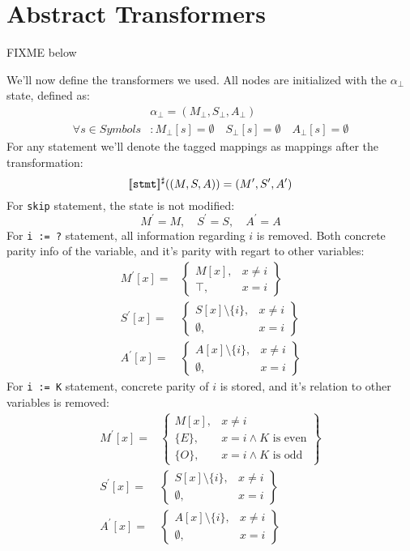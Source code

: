 \section*{Abstract Transformers}

FIXME below


We'll now define the transformers we used. All nodes are initialized with the $\alpha_\bot$ state, defined as:
\begin{align*}
	&\alpha_\bot=(M_\bot, S_\bot, A_\bot) \\
	\forall s \in Symbols&:
	M_\bot[s] =\emptyset  \quad
	S_\bot[s] =\emptyset \quad
	A_\bot[s] =\emptyset
\end{align*}
For any statement we'll denote the tagged mappings as mappings after the transformation:
\begin{equation*}
	[\![\texttt{stmt}]\!]^\sharp((M, S, A)) = (M^\prime,S^\prime,A^\prime)
\end{equation*}
For \texttt{skip} statement, the state is not modified:
\begin{equation*}
	M^\prime = M, \quad S^\prime = S, \quad A^\prime = A
\end{equation*}
For \texttt{i := ?} statement, all information regarding $i$ is removed. Both concrete parity info of the variable, and it's parity with regart to other variables:
\begin{align*}
M^\prime[x] = & \left.
	\begin{cases}
		M[x], & x\ne i \\
		\top, & x = i
	\end{cases}
\right\}\\
S^\prime[x] = & \left.
	\begin{cases}
		S[x] \setminus \{i\}, & x\ne i \\
		\emptyset, & x = i
	\end{cases}
\right\}\\
A^\prime[x] = & \left.
\begin{cases}
	A[x] \setminus \{i\}, & x\ne i \\
	\emptyset, & x = i
\end{cases}
\right\}
\end{align*}
For \texttt{i := K} statement, concrete parity of $i$ is stored, and it's relation to other variables is removed:
\begin{align*}
M^\prime[x] = & \left.
	\begin{cases}
		M[x], & x\ne i \\
		\{E\}, & x = i \wedge K \text{ is even} \\
		\{O\}, & x = i \wedge K \text{ is odd}
	\end{cases}
\right\}\\
S^\prime[x] = & \left.
	\begin{cases}
		S[x] \setminus \{i\}, & x\ne i \\
		\emptyset, & x = i
	\end{cases}
\right\}\\
A^\prime[x] = & \left.
\begin{cases}
	A[x] \setminus \{i\}, & x\ne i \\
	\emptyset, & x = i
\end{cases}
\right\}
\end{align*}
